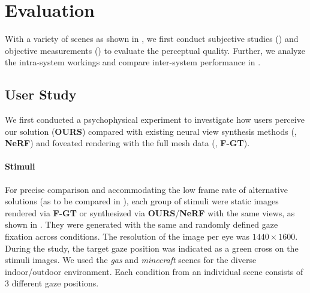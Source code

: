 \section{Evaluation}
\label{sec:result}

With a variety of scenes as shown in , we first conduct subjective studies () and objective measurements () to evaluate the perceptual quality.
Further, we analyze the intra-system workings and compare inter-system performance in .

\subsection{User Study}
\label{sec:study:user}
We first conducted a psychophysical experiment to investigate how users perceive our solution ({\bf OURS}) compared with existing neural view synthesis methods (\cite{mildenhall2020nerf}, {\bf NeRF}) and foveated rendering with the full mesh data (\cite{perry2002gaze}, {\bf F-GT}).


\paragraph{Stimuli}
For precise comparison and accommodating the low frame rate of alternative solutions (as to be compared in ), each group of stimuli were static images rendered via {\bf F-GT} or synthesized via  {\bf OURS}/{\bf NeRF} with the same views, as shown in .
They were generated with the same and randomly defined gaze fixation across conditions.
The resolution of the image per eye was $1440 \times 1600$. 
During the study, the target gaze position was indicated as a green cross on the stimuli images.
We used the {\it gas} and {\it minecraft} scenes for the diverse indoor/outdoor environment.
Each condition from an individual scene consists of  $3$ different gaze positions.

